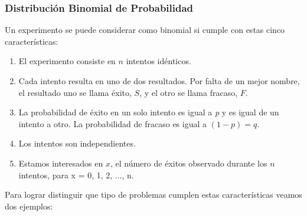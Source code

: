 \documentclass[]{article}
\begin{document}
\subsubsection{Distribución Binomial de Probabilidad}
 Un experimento se puede considerar como binomial si cumple con estas cinco características:
 \begin{enumerate}
 	\item El experimento consiste en $n$ intentos idénticos.
 	\item Cada intento resulta en uno de dos resultados. Por falta de un mejor nombre, el resultado uno se llama éxito, $S$, y el otro se llama fracaso, $F$.
 	\item La probabilidad de éxito en un solo intento es igual a \textit{p} y es igual de un intento a otro. La probabilidad de fracaso es igual a $(1 - p) = q$.
 	\item Los intentos son independientes.
 	\item Estamos interesados en $x$, el número de éxitos observado durante los $n$ intentos, para x = 0, 1, 2, ..., n.
 \end{enumerate}
 Para lograr distinguir que tipo de problemas cumplen estas características veamos dos ejemplos:
\end{document}
